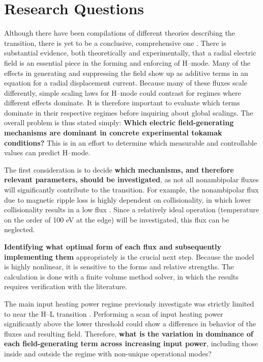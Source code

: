 \section{Research Questions}\label{sec:research_questions}
Although there have been compilations of different theories describing the transition, there is yet to be a conclusive, comprehensive one \cite{connor_review_2000}.
There is substantial evidence, both theoretically and experimentally, that a radial electric field is an essential piece in the forming and enforcing of H--mode.
Many of the effects in generating and suppressing the field show up as additive terms in an equation for a radial displacement current.
Because many of these fluxes scale differently, simple scaling laws for H--mode could contrast for regimes where different effects dominate.
It is therefore important to evaluate which terms dominate in their respective regimes before inquiring about global scalings.
The overall problem is thus stated simply: \textbf{Which electric field-generating mechanisms are dominant in concrete experimental tokamak conditions?}
This is in an effort to determine which measurable and controllable values can predict H--mode.

The first consideration is to decide \textbf{which mechanisms, and therefore relevant parameters, should be investigated}, as not all nonambipolar fluxes will significantly contribute to the transition.
For example, the nonambipolar flux due to magnetic ripple loss is highly dependent on collisionality, in which lower collisionality results in a low flux \cite{stringer_effect_1972}.
Since a relatively ideal operation (temperature on the order of 100 eV at the edge) will be investigated, this flux can be neglected.

\textbf{Identifying what optimal form of each flux and subsequently implementing them} appropriately is the crucial next step.
Because the model is highly nonlinear, it is sensitive to the forms and relative strengths.
The calculation is done with a finite volume method solver, in which the results requires verification with the literature.

The main input heating power regime previously investigate was strictly limited to near the H--L transition \cite{staps_backstepping_2017}.
Performing a scan of input heating power significantly above the lower threshold could show a difference in behavior of the fluxes and resulting field.
Therefore, \textbf{what is the variation in dominance of each field-generating term across increasing input power}, including those inside and outside the regime with non-unique operational modes?

